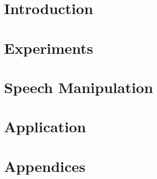 \documentclass[11pt, openright, titlepage, table, twoside]{book}
\begin{document}
\maketitle




% 

\part{Introduction}
\label{part:introduction}





\part{Experiments}
\label{part:experiments}





\part{Speech Manipulation}
\label{part:speech_manipulation}

\part{Application}
\label{part:application}







\printbibliography[heading=bibintoc, title={Bibliography}]


\appendix

\renewcommand{\thesection}{\Roman{section}} 
\renewcommand{\thesubsection}{\thesection.\Roman{subsection}}

\part{Appendices}
\label{part:appendices}





\end{document}
